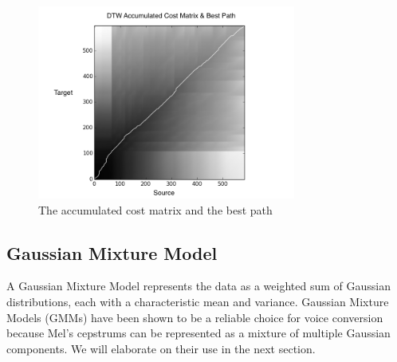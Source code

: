 \begin{figure}[htb]

\begin{minipage}[b]{1.0\linewidth}
  \centering
  \centerline{\includegraphics[width=8.5cm]{image10}}
\end{minipage}
\caption{The accumulated cost matrix and the best path}
\label{fig:accucostmatrix}
%
\end{figure}

\subsection{Gaussian Mixture Model}
A Gaussian Mixture Model represents the data as a weighted sum of Gaussian distributions, each with a characteristic mean and variance. Gaussian Mixture Models (GMMs) have been shown to be a reliable choice for voice conversion because Mel's cepstrums can be represented as a mixture of multiple Gaussian components\cite{stylianou1998continuous}. We will elaborate on their use in the next section.